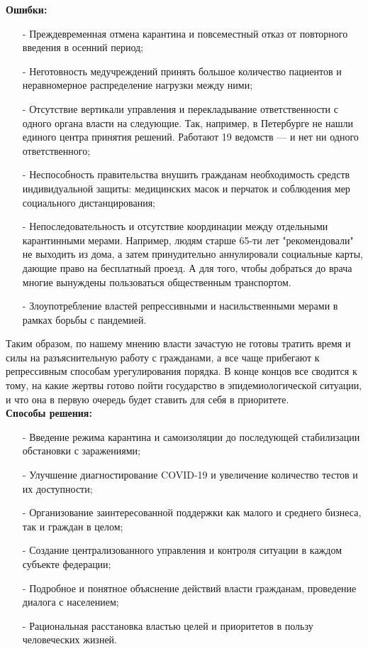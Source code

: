 \documentclass[a4paper, 12pt]{extarticle}
\begin{document}
\textbf{Ошибки:}
\begin{itemize}
    \item[-] Преждевременная отмена карантина и повсеместный отказ от
        повторного введения в осенний период;
    \item[-] Неготовность медучреждений принять большое количество пациентов и
        неравномерное распределение нагрузки между ними;
    \item[-] Отсутствие вертикали управления и перекладывание ответственности с
        одного органа власти на следующие. Так, например, в Петербурге не нашли
        единого центра принятия решений. Работают 19 ведомств — и нет ни одного
        ответственного;
    \item[-] Неспособность правительства внушить гражданам необходимость
        средств индивидуальной защиты: медицинских масок и перчаток и соблюдения мер
        социального дистанцирования;
    \item[-] Непоследовательность и отсутствие координации между отдельными карантинными мерами.
        Например, людям старше 65-ти лет "рекомендовали" не выходить из дома, а затем принудительно
        аннулировали социальные карты, дающие право на
        бесплатный проезд. А для того, чтобы добраться до врача многие
        вынуждены пользоваться общественным транспортом.
    \item[-] Злоупотребление властей репрессивными и насильственными мерами в рамках
        борьбы с пандемией.
\end{itemize}

Таким образом, по нашему мнению власти зачастую не готовы тратить время и силы
на разъяснительную работу с гражданами, а все чаще прибегают к репрессивным
способам урегулирования порядка. В конце концов все сводится к тому, на какие
жертвы готово пойти государство в эпидемиологической ситуации, и что она в
первую очередь будет ставить для себя в приоритете.
\\

\textbf{Способы решения:}
\begin{itemize}
    \item[-] Введение режима карантина и самоизоляции до последующей стабилизации
        обстановки с заражениями;
    \item[-] Улучшение диагностирование COVID-19 и увеличение количество
        тестов и их доступности;
    \item[-] Организование заинтересованной поддержки как малого и среднего бизнеса, так и
        граждан в целом;
    \item[-] Создание централизованного управления и контроля ситуации в каждом
        субъекте федерации;
    \item[-] Подробное и понятное объяснение действий власти гражданам,
        проведение диалога с населением;
    \item[-] Рациональная расстановка властью целей и приоритетов в пользу человеческих
        жизней.
\end{itemize}
\end{document}
